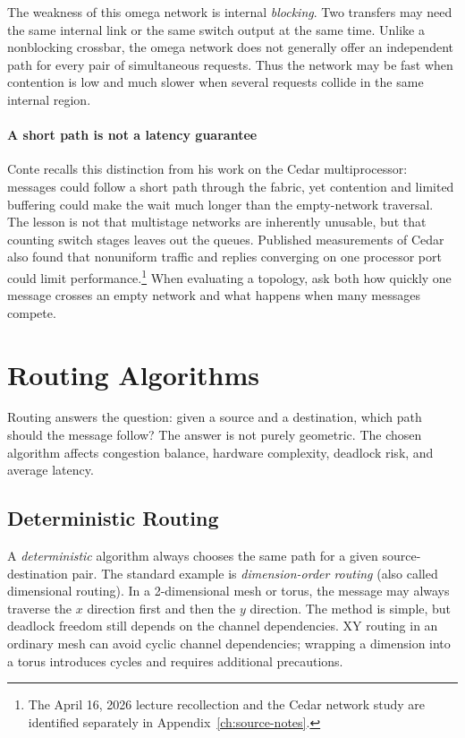The weakness of this omega network is internal \textit{blocking}.
Two transfers may need the same internal link or the same switch output at the same time.
Unlike a nonblocking crossbar, the omega network does not generally offer an independent path for every pair of simultaneous requests.
Thus the network may be fast when contention is low and much slower when several requests collide in the same internal region.

\paragraph{A short path is not a latency guarantee}
Conte recalls this distinction from his work on the Cedar multiprocessor: messages could follow a short path through the fabric, yet contention and limited buffering could make the wait much longer than the empty-network traversal.
The lesson is not that multistage networks are inherently unusable, but that counting switch stages leaves out the queues.
Published measurements of Cedar also found that nonuniform traffic and replies converging on one processor port could limit performance.\footnote{The April 16, 2026 lecture recollection and the Cedar network study are identified separately in Appendix~\ref{ch:source-notes}.}
When evaluating a topology, ask both how quickly one message crosses an empty network and what happens when many messages compete.


\section{Routing Algorithms}\label{sec:pin-routing}
Routing answers the question: given a source and a destination, which path should the message follow?
The answer is not purely geometric.
The chosen algorithm affects congestion balance, hardware complexity, deadlock risk, and average latency.

\subsection{Deterministic Routing}\label{subsec:pin-deterministic-routing}
A \textit{deterministic} algorithm always chooses the same path for a given source-destination pair.
The standard example is \textit{dimension-order routing} (also called dimensional routing).
In a 2-dimensional mesh or torus, the message may always traverse the $x$ direction first and then the $y$ direction.
The method is simple, but deadlock freedom still depends on the channel dependencies.
XY routing in an ordinary mesh can avoid cyclic channel dependencies; wrapping a dimension into a torus introduces cycles and requires additional precautions.

